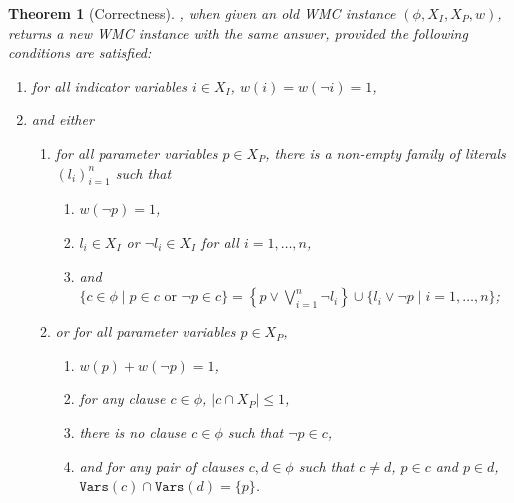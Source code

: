 \documentclass{article}
\newtheorem{theorem}{Theorem}
\theoremstyle{definition}
\theoremstyle{remark}
\begin{document}
\begin{theorem}[Correctness]
  , when given an old WMC instance $(\phi, X_I, X_P,
  w)$, returns a new WMC instance with the same answer, provided the following
  conditions are satisfied:
  \begin{enumerate}
  \item for all indicator variables $i \in X_I$, $w(i) = w(\neg i) = 1$,
  \item and either
    \begin{enumerate}
    \item for all parameter variables $p \in X_P$, there is a non-empty family
      of literals $(l_i)_{i=1}^n$ such that \label{condition:d02}
      \begin{enumerate}
      \item $w(\neg p) = 1$,
      \item $l_i \in X_I$ or $\neg l_i \in X_I$ for all $i = 1, \dots, n$,
        \label{condition:equivalence1}
      \item and $\{ c \in \phi \mid p \in c \text{ or } \neg p \in c \} =
        \left\{p \lor \bigvee_{i=1}^n \neg l_i \right\} \cup \{ l_i \lor \neg p
        \mid i = 1, \dots, n \}$; \label{condition:equivalence2}
      \end{enumerate}
    \item or for all parameter variables $p \in X_P$, \label{condition:bklm16}
      \begin{enumerate}
      \item $w(p) + w(\neg p) = 1$,
      \item for any clause $c \in \phi$, $|c \cap X_P| \le 1$,
      \item there is no clause $c \in \phi$ such that $\neg p \in c$,
      \item and for any pair of clauses $c, d \in \phi$ such that $c \ne d$, $p
        \in c$ and $p \in d$, $\mathtt{Vars}(c) \cap \mathtt{Vars}(d) = \{ p
        \}$.
      \end{enumerate}
    \end{enumerate}
  \end{enumerate}
\end{theorem} %
\end{document}
